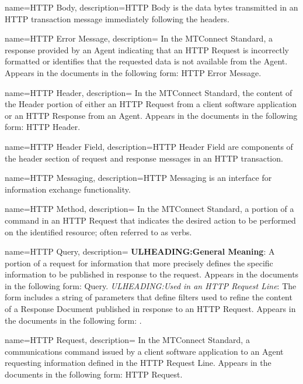 {
    name={HTTP Body},
	description={\gls{HTTP Body} is the data bytes transmitted in an HTTP transaction message immediately following the headers.}
}

{
    name={HTTP Error Message},
	description={
	In the MTConnect Standard, a response provided by an \gls{Agent} indicating that an \gls{HTTP Request} is incorrectly formatted or identifies that the requested data is not available from the \gls{Agent}.  
	Appears in the documents in the following form: \gls{HTTP Error Message}.
}
}

{
    name={HTTP Header},
	description={
	In the MTConnect Standard, the content of the \gls{Header} portion of either an \gls{HTTP Request} from a client software application or an \gls{HTTP Response} from an \gls{Agent}.
	Appears in the documents in the following form: \gls{HTTP Header}.
}
}

{
    name={HTTP Header Field},
	description={\gls{HTTP Header Field} are components of the header section of request and response messages in an HTTP transaction.}
}

{
    name={HTTP Messaging},
	description={\gls{HTTP Messaging} is an interface for information exchange functionality.}
}

{
    name={HTTP Method},
	description={
	In the MTConnect Standard, a portion of a command in an \gls{HTTP Request} that indicates the desired action to be performed on the identified resource; often referred to as verbs.
}
}

{
    name={HTTP Query},
	description={
	\textbf{ULHEADING:General Meaning}:
	A portion of a request for information that more precisely defines the specific information to be published in response to the request. 
	Appears in the documents in the following form: \gls{Query}.
	\textit{ULHEADING:Used in an \gls{HTTP Request Line}}:
	The form  includes a string of parameters that define filters used to refine the content of a \gls{Response Document} published in response to an \gls{HTTP Request}.
	Appears in the documents in the following form: .
}
}

{
    name={HTTP Request},
	description={
	In the MTConnect Standard, a communications command issued by a client software application to an \gls{Agent} requesting information defined in the \gls{HTTP Request Line}.
	Appears in the documents in the following form: \gls{HTTP Request}.
}
}

